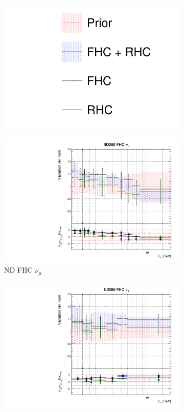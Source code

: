 \begin{figure}
\centering
\begin{subfigure}{0.95\textwidth}
  \centering
  \includegraphics[width=0.24\linewidth]{figs/fhcrhcfits_leg}
\end{subfigure}
\begin{subfigure}{0.24\textwidth}
  \centering
  \includegraphics[width=0.95\linewidth]{figs/fhcrhcfitsflux_0}
  \caption{ND FHC $\nu_{\mu}$}
\end{subfigure}
\begin{subfigure}{0.24\textwidth}
  \centering
  \includegraphics[width=0.95\linewidth]{figs/fhcrhcfitsflux_1}

\end{subfigure}
\end{figure}
